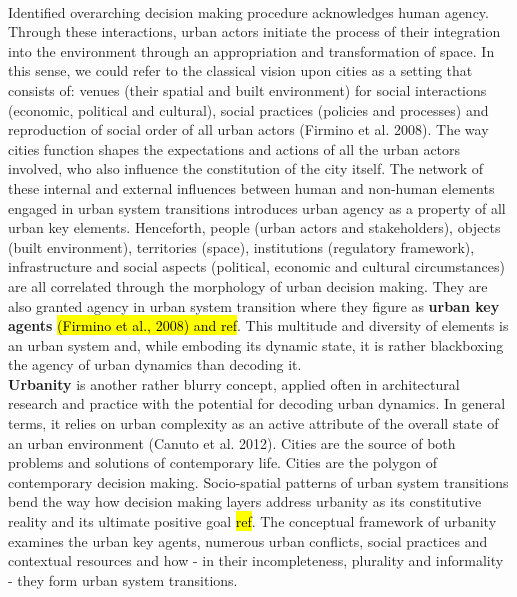 \documentclass[11pt]{report}
\begin{document}
\\
Identified overarching decision making procedure acknowledges human agency. Through these interactions, urban actors initiate the process of their integration into the environment through an appropriation and transformation of space. In this sense, we could refer to the classical vision upon cities as a setting that consists of: venues (their spatial and built environment) for social interactions (economic, political and cultural), social practices (policies and processes) and reproduction of social order of all urban actors (Firmino et al. 2008). The way cities function shapes the expectations and actions of all the urban actors involved, who also influence the constitution of the city itself. The network of these internal and external influences between human and non-human elements engaged in urban system transitions introduces urban agency as a property of all urban key elements. Henceforth, people (urban actors and stakeholders), objects (built environment), territories (space), institutions (regulatory framework), infrastructure and social  aspects (political, economic and cultural circumstances) are all correlated through the morphology of urban decision making. They are also granted agency in urban system transition where they figure as \textbf{urban key agents} \hl{(Firmino et al., 2008) and ref}. This multitude and diversity of elements is an urban system and, while emboding its dynamic state, it is rather blackboxing the agency of urban dynamics than decoding it.
\\
\textbf{Urbanity} is another rather blurry concept, applied often in architectural research and practice with the potential for decoding urban dynamics. In general terms, it relies on urban complexity as an active attribute of the overall state of an urban environment (Canuto et al. 2012). Cities are the source of both problems and solutions of contemporary life. Cities are the polygon of contemporary decision making. Socio-spatial patterns of urban system transitions bend the way how decision making layers address urbanity as its constitutive reality and its ultimate positive goal \hl{ref}. The conceptual framework of urbanity examines the urban key agents, numerous urban conflicts, social practices and contextual resources and how - in their incompleteness, plurality and informality - they form urban system transitions.
\\
\end{document}
